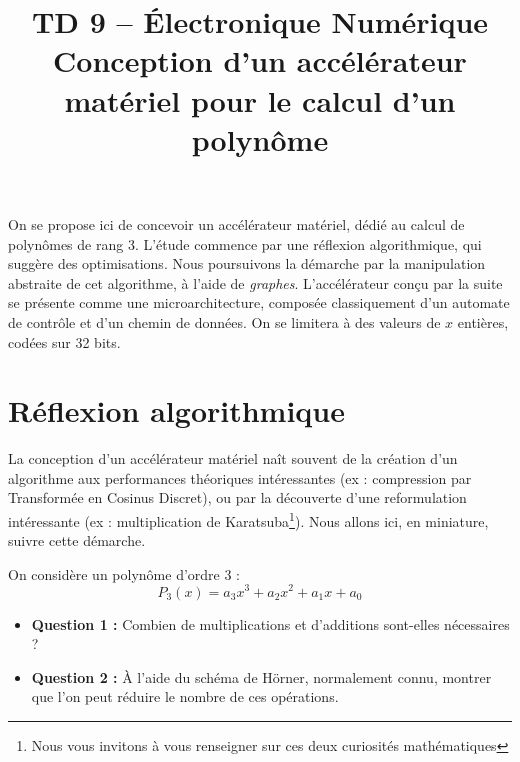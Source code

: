 \documentclass[a4paper,11pt]{article}
\title{\textcolor{primary}{\Huge\bfseries TD 9 -- Électronique Numérique}\\[0.5em] \Large Conception d'un accélérateur matériel pour le calcul d'un polynôme}
\author{}
\date{}
\begin{document}
\maketitle
\thispagestyle{fancy}   %
\vspace{-2em}

\begin{notebox}
On se propose ici de concevoir un accélérateur matériel, dédié au calcul de polynômes de rang 3. L'étude commence par une réflexion algorithmique, qui suggère des optimisations. Nous poursuivons la démarche par la manipulation abstraite de cet algorithme, à l'aide de \textit{graphes}. L'accélérateur conçu par la suite se présente comme une microarchitecture, composée classiquement d'un automate de contrôle et d'un chemin de données. On se limitera à des valeurs de $x$ entières, codées sur 32 bits.
\end{notebox}

\vspace{1em}

\section{Réflexion algorithmique}

La conception d'un accélérateur matériel naît souvent de la création d'un algorithme aux performances théoriques intéressantes (ex : compression par Transformée en Cosinus Discret), ou par la découverte d'une reformulation intéressante (ex : multiplication de Karatsuba\footnote{Nous vous invitons à vous renseigner sur ces deux curiosités mathématiques}). Nous allons ici, en miniature, suivre cette démarche.

On considère un polynôme d'ordre 3 :
\begin{equation}
P_3(x)=a_3x^3+a_2x^2+a_1x+a_0
\end{equation}

\begin{questionbox}
\begin{itemize}
    \item \textbf{Question 1 :} Combien de multiplications et d'additions sont-elles nécessaires ?
    \item \textbf{Question 2 :} À l'aide du schéma de Hörner, normalement connu, montrer que l'on peut réduire le nombre de ces opérations.
\end{itemize}
\end{questionbox}
\end{document}
